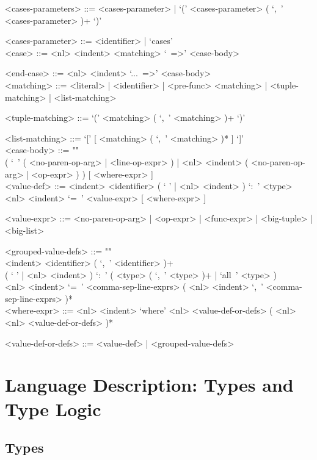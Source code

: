 \documentclass{article}
\begin{document}
\begin{grammar}
<cases-parameters> ::=
<cases-parameter> | `(' <cases-parameter> ( `,\ ' <cases-parameter> )+ `)'

<cases-parameter> ::= <identifier> | `cases'
\\

<case> ::=  <nl> <indent> <matching> `\ =>' <case-body>

<end-case> ::= <nl> <indent> `...\ =>' <case-body>
\\

<matching> ::= 
<literal> | <identifier> | <pre-func> <matching> | <tuple-matching> |
<list-matching>

<tuple-matching> ::= `(' <matching> ( `,\ ' <matching> )+ `)'

<list-matching> ::= `[' [ <matching> ( `,\ ' <matching> )* ] `]'
\\

<case-body> ::= ""\\
( `\ ' ( <no-paren-op-arg> | <line-op-expr> ) |
<nl> <indent> ( <no-paren-op-arg> | <op-expr> ) )
[ <where-expr> ]
\\

<value-def> ::= 
<indent> <identifier> 
( ` ' | <nl> <indent> ) `:\ ' <type> 
<nl> <indent> `=\ ' <value-expr> [ <where-expr> ]

<value-expr> ::=
<no-paren-op-arg> | <op-expr> | <func-expr> | <big-tuple> | <big-list>

<grouped-value-defs> ::= ""\\
<indent> <identifier> ( `,\ ' <identifier> )+ \\
( ` ' | <nl> <indent> ) `:\ ' ( <type> ( `,\ ' <type> )+ | `all\ ' <type> ) \\
<nl> <indent> `=\ '
<comma-sep-line-exprs> ( <nl> <indent> `,\ ' <comma-sep-line-exprs> )*
\\

<where-expr> ::=
<nl> <indent> `where' <nl> <value-def-or-defs> ( <nl> <nl> <value-def-or-defs> )*

<value-def-or-defs> ::= <value-def> | <grouped-value-defs> 
\end{grammar}

\section{Language Description: Types and Type Logic}

\subsection{Types}
\label{subsec:types}
\end{document}
